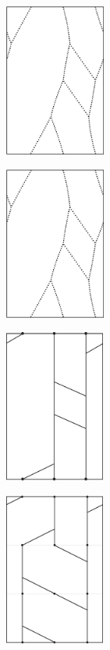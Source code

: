\documentclass[12pt,twoside]{reedthesis}
\theoremstyle{definition}
\begin{document}
\begin{figure}[p]
  \centering
  \begin{subfigure}[t]{0.24\linewidth}
    \centering
    \includegraphics[height=5cm]{figures/subset_loop_pqq.pdf}
  \end{subfigure}
  \hfill
  \begin{subfigure}[t]{0.24\linewidth}
    \centering
    \includegraphics[height=5cm]{figures/subset_loop_pqq_shifted.pdf}
  \end{subfigure}
  \hfill
  \begin{subfigure}[t]{0.24\linewidth}
    \centering
    \includegraphics[height=5cm]{figures/subset_loop_pqq_normalized.pdf}
  \end{subfigure}
  \hfill
  \begin{subfigure}[t]{0.24\linewidth}
    \centering
    \includegraphics[height=5cm]{figures/subset_loop_pqq_decomposed.pdf}

\end{subfigure}
\end{figure}
\end{document}

